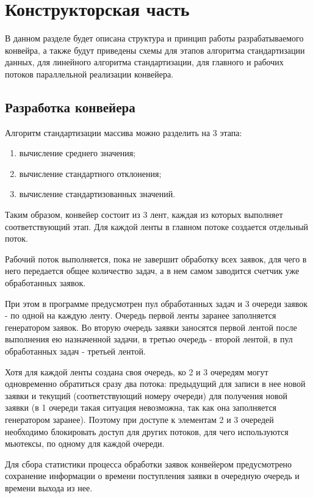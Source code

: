 \chapter{Конструкторская часть}

В данном разделе будет описана структура и принцип работы разрабатываемого конвейра, а также будут приведены схемы для этапов алгоритма стандартизации данных, для линейного алгоритма стандартизации, для главного и рабочих потоков параллельной реализации конвейера.

\section{Разработка конвейера}

Алгоритм стандартизации массива можно разделить на 3 этапа:
\begin{enumerate}[label={\arabic*)}]
	\item вычисление среднего значения;
	\item вычисление стандартного отклонения;
	\item вычисление стандартизованных значений.
\end{enumerate}

Таким образом, конвейер состоит из 3 лент, каждая из которых выполняет соответствующий этап. Для каждой ленты в главном потоке создается отдельный поток. 

Рабочий поток выполняется, пока не завершит обработку всех заявок, для чего в него передается общее количество задач, а в нем самом заводится счетчик уже обработанных заявок. 


При этом в программе предусмотрен пул обработанных задач и 3 очереди заявок - по одной на каждую ленту. Очередь первой ленты заранее заполняется генератором заявок. Во вторую очередь заявки заносятся первой лентой после выполнения ею назначенной задачи, в третью очередь - второй лентой, в пул обработанных задач  - третьей лентой.

Хотя для каждой ленты создана своя очередь, ко 2 и 3 очередям могут одновременно обратиться сразу два потока: предыдущий для записи в нее новой заявки и текущий (соответствующий номеру очереди) для получения новой заявки (в 1 очереди такая ситуация невозможна, так как она заполняется генератором заранее). Поэтому при доступе к элементам 2 и 3 очередей необходимо блокировать доступ для других потоков, для чего используются мьютексы, по одному для каждой очереди.
  
Для сбора статистики процесса обработки заявок конвейером предусмотрено сохранение информации о времени поступления заявки в очередную очередь и времени выхода из нее.

